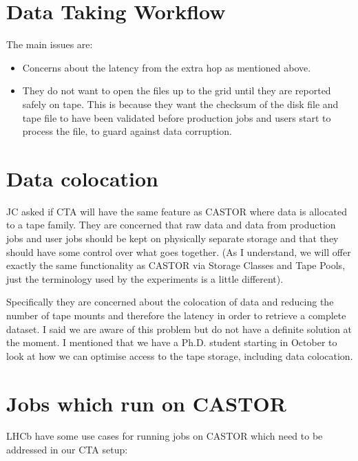 \documentclass{lhcb+cta}
\begin{document}
\section*{Data Taking Workflow}

The main issues are:
\begin{itemize}
    \item Concerns about the latency from the extra hop as mentioned above.
    \item They do not want to open the files up to the grid until they are reported safely on tape. This is because they want the checksum of the disk file and tape file to have been validated before production jobs and users start to process the file, to guard against data corruption.
\end{itemize}

\section*{Data colocation}

JC asked if CTA will have the same feature as CASTOR where data is allocated to a tape family. They are concerned that raw data and data from production jobs and user jobs should be kept on physically separate storage and that they should have some control over what goes together. (As I understand, we will offer exactly the same functionality as CASTOR via Storage Classes and Tape Pools, just the terminology used by the experiments is a little different).

Specifically they are concerned about the colocation of data and reducing the number of tape mounts and therefore the latency in order to retrieve a complete dataset. I said we are aware of this problem but do not have a definite solution at the moment. I mentioned that we have a Ph.D. student starting in October to look at how we can optimise access to the tape storage, including data colocation.

\section*{Jobs which run on CASTOR}

LHCb have some use cases for running jobs on CASTOR which need to be addressed in our CTA setup:
\end{document}
